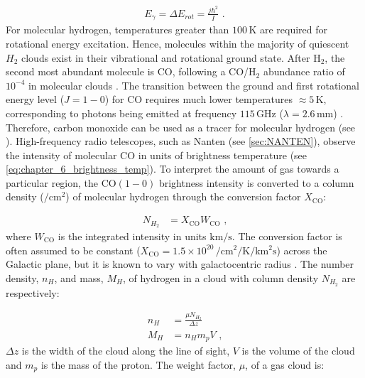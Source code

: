 \begin{equation}
    \begin{aligned}
        E_\gamma=\Delta E_{rot} = \frac{j\hbar^2}{I}\text{ .}
    \end{aligned}
\end{equation}
\noindent For molecular hydrogen, temperatures greater than $100\,\si{\kelvin}$ are required for rotational energy excitation. Hence, molecules within the majority of quiescent $H_2$ clouds exist in their vibrational and rotational ground state. 
\newpar 
After H$_2$, the second most abundant molecule is CO, following a  CO/H$_2$ abundance ratio of $10^{-4}$ in molecular clouds \citep{1994ApJ...428L..69L}. The transition between the ground and first rotational energy level ($J=1-0$) for CO requires much lower temperatures $\approx 5\,\si{\kelvin}$, corresponding to photons being emitted at frequency $115\,\si{\giga\hertz}$ ($\lambda=2.6\,\si{\milli\meter}$) \citep{alma9927598238601811}. Therefore, carbon monoxide can be used as a tracer for molecular hydrogen (see \citep{Bolatto2013}).
\newpar
High-frequency radio telescopes, such as Nanten (see \autoref{sec:NANTEN}), observe the intensity of molecular CO in units of brightness temperature (see \autoref{eq:chapter_6_brightness_temp}). To interpret the amount of gas towards a particular region, the CO$(1-0)$ brightness intensity is converted to a column density ($\si{\per\centi\meter\squared}$) of molecular hydrogen through the conversion factor $X_\text{CO}$:

\begin{equation}
	\begin{aligned}
		N_{H_2}&=X_\text{CO}W_\text{CO}\text{ ,}
	\end{aligned}
\end{equation}
\noindent where $W_\text{CO}$ is the integrated intensity in units $\si{\kilo\meter\per\second}$. The conversion factor is often assumed to be constant ($X_\text{CO}=1.5\times 10^{20}\,\si{\per\centi\meter\squared\per\kelvin\per\kilo\meter\squared\second}$) across the Galactic plane, but it is known to vary with galactocentric radius \citep{2004A&A...422L..47S}. The number density, $n_H$, and mass, $M_H$, of hydrogen in a cloud with column density $N_{H_2}$ are respectively:

\begin{equation}
	\begin{aligned}
		n_H&=\frac{\mu N_{H_2}}{\Delta z} \label{eq:06_density_gas} \\
		M_H&=n_Hm_pV\text{ ,}
	\end{aligned}
\end{equation}
\noindent $\Delta z$ is the width of the cloud along the line of sight, $V$ is the volume of the cloud and $m_p$ is the mass of the proton. The weight factor, $\mu$, of a gas cloud is:

